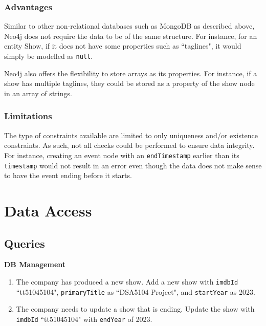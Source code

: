 \documentclass[10pt,titlepage]{article}
\begin{document}
\subsubsection{Advantages}
Similar to other non-relational databases such as MongoDB as described above, Neo4j does not require the data to be of
the same structure. For instance, for an entity Show, if it does not have some properties such as ``taglines", it would
simply be modelled as \texttt{null}.

Neo4j also offers the flexibility to store arrays as its properties. For instance, if a show has multiple taglines, they could be stored as a property of the show node in an array of strings.

\subsubsection{Limitations}

The type of constraints available are limited to only uniqueness and/or existence constraints. As such, not all checks
could be performed to ensure data integrity. For instance, creating an event node with an \texttt{endTimestamp} earlier
than its \texttt{timestamp} would not result in an error even though the data does not make sense to have the event
ending before it starts.

\pagebreak
\section{Data Access}

\subsection{Queries}
\textbf{DB Management}
\begin{enumerate}
    \item The company has produced a new show. Add a new show with \texttt{imdbId} ``tt51045104", \texttt{primaryTitle}
        as ``DSA5104 Project", and \texttt{startYear} as 2023.
    \item The company needs to update a show that is ending. Update the show with \texttt{imdbId} ``tt51045104" with
        \texttt{endYear} of 2023.
\end{enumerate}
\end{document}
